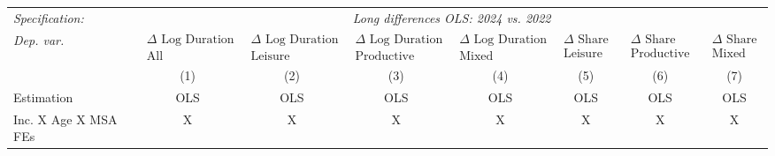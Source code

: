 \documentclass[12pt]{article}
\begin{document}
\begin{table}[htbp]
\footnotesize
 \centering \setlength{\tabcolsep}{2pt}
\begin{adjustbox}{max width=\textwidth}
\begin{tabular}{@{}l*{7}{c}@{}} 
\toprule
\textit{Specification:} &  \multicolumn{7}{c}{\textit{Long differences OLS: 2024 vs. 2022}}\\
\cmidrule(lr){2-8} 
\addlinespace
\textit{Dep. var.} &  $\substack{\Delta \text{ Log Duration} \\ \text{All}}$  &   $\substack{\Delta \text{ Log Duration} \\ \text{Leisure}}$ &  $\substack{\Delta \text{ Log Duration} \\ \text{Productive}}$   &  $\substack{\Delta \text{ Log Duration} \\ \text{Mixed}}$   &  $\substack{\Delta \text{ Share} \\ \text{Leisure}}$  &  $\substack{\Delta \text{ Share} \\ \text{Productive}}$  &  $\substack{\Delta \text{ Share} \\ \text{Mixed}}$ \\
   \cmidrule(lr){2-2}   \cmidrule(lr){3-3}   \cmidrule(lr){4-4}   \cmidrule(lr){5-5}   \cmidrule(lr){6-6}   \cmidrule(lr){7-7}   \cmidrule(lr){8-8} 
 &  (1) & (2) & (3) & (4) & (5) & (6) & (7) \\
   \addlinespace
   \midrule

\midrule
 	Estimation & OLS & OLS & OLS & OLS & OLS & OLS & OLS   \\ 
Inc. X Age X MSA FEs     & X & X	& X & X	& X & X	& X      \\	
    \bottomrule
\end{tabular}
\end{adjustbox}
\end{table}


\clearpage
\end{document}
